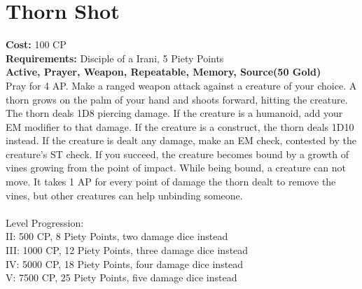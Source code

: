 \section{Thorn Shot}
\textbf{Cost:} 100 CP\\
\textbf{Requirements:} Disciple of a Irani, 5 Piety Points \\
\textbf{Active, Prayer, Weapon, Repeatable, Memory, Source(50 Gold)}\\
Pray for 4 AP. Make a ranged weapon attack against a creature of your choice. A thorn grows on the palm of your hand and shoots forward, hitting the creature. The thorn deals 1D8 piercing damage. If the creature is a humanoid, add your EM modifier to that damage. If the creature is a construct, the thorn deals 1D10 instead. If the creature is dealt any damage, make an EM check, contested by the creature's ST check. If you succeed, the creature becomes bound by a growth of vines growing from the point of impact. While being bound, a creature can not move. It takes 1 AP for every point of damage the thorn dealt to remove the vines, but other creatures can help unbinding someone.\\
\\
Level Progression:\\
II: 500 CP, 8 Piety Points, two damage dice instead\\
III: 1000 CP, 12 Piety Points, three damage dice instead\\
IV: 5000 CP, 18 Piety Points, four damage dice instead\\
V: 7500 CP, 25 Piety Points, five damage dice instead\\
